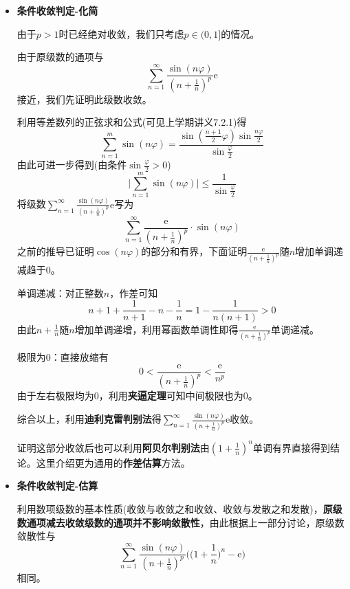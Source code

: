 \documentclass[a4paper,UTF8,fontset=windows,AutoFakeBold]{ctexart}
\newcommand*{\er}{\mathrm{e}}
\newcommand*{\suminf}[1][n=1]{\sum_{#1}^\infty}
\newcommand*{\note}{\noindent *}
\theoremstyle{ex}
\begin{document}
\begin{framed}
{\begin{itemize}
        \item \textbf{条件收敛判定-化简}
        
        由于$p>1$时已经绝对收敛，我们只考虑$p\in(0,1]$的情况。
        
        由于原级数的通项与
        $$\suminf\frac{\sin(n\varphi)}{(n+\frac{1}{n})^p}\er$$
        接近，我们先证明此级数收敛。

        利用等差数列的正弦求和公式(可见上学期讲义7.2.1)得
        $$\sum_{n=1}^m\sin(n\varphi)=\frac{\sin(\frac{n+1}{2}\varphi)\sin\frac{n\varphi}{2}}{\sin\frac{\varphi}{2}}$$
        由此可进一步得到(由条件$\sin\frac{\varphi}{2}>0$)
        $$\bigg|\sum_{n=1}^m\sin(n\varphi)\bigg|\le\frac{1}{\sin\frac{\varphi}{2}}$$
        将级数$\suminf\frac{\sin(n\varphi)}{(n+\frac{1}{n})^p}\er$写为
        $$\suminf\frac{\er}{(n+\frac{1}{n})^p}\cdot\sin(n\varphi)$$
        之前的推导已证明$\cos(n\varphi)$的部分和有界，下面证明$\frac{\er}{(n+\frac{1}{n})^p}$随$n$增加单调递减趋于0。
        
        单调递减：对正整数$n$，作差可知
        $$n+1+\frac{1}{n+1}-n-\frac{1}{n}=1-\frac{1}{n(n+1)}>0$$
        由此$n+\frac{1}{n}$随$n$增加单调递增，利用幂函数单调性即得$\frac{\er}{(n+\frac{1}{n})^p}$单调递减。

        极限为0：直接放缩有
        $$0<\frac{\er}{(n+\frac{1}{n})^p}<\frac{\er}{n^p}$$
        由于左右极限均为0，利用\textbf{夹逼定理}可知中间极限也为0。

        综合以上，利用\textbf{迪利克雷判别法}得$\suminf\frac{\sin(n\varphi)}{(n+\frac{1}{n})^p}\er$收敛。

        \note 证明这部分收敛后也可以利用\textbf{阿贝尔判别法}由$(1+\frac{1}{n})^n$单调有界直接得到结论。这里介绍更为通用的\textbf{作差估算}方法。

        \item \textbf{条件收敛判定-估算}
        
        利用数项级数的基本性质(收敛与收敛之和收敛、收敛与发散之和发散)，\textbf{原级数通项减去收敛级数的通项并不影响敛散性}，由此根据上一部分讨论，原级数敛散性与
        $$\suminf\frac{\sin(n\varphi)}{(n+\frac{1}{n})^p}\bigg(\bigg(1+\frac{1}{n}\bigg)^n-\er\bigg)$$
        相同。


\end{itemize}}
\end{framed}
\end{document}
